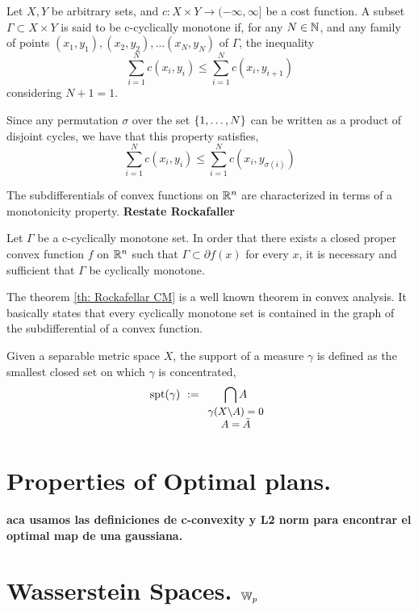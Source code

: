 \begin{definition}
	Let $X , Y$ be arbitrary sets, and $c:X\times Y \rightarrow (-\infty, \infty]$ be a cost function. A subset $\Gamma \subset X \times Y$ is said to be c-cyclically monotone if, for any $N\in\mathbb{N}$, and any family of points $(x_1, y_1), (x_2, y_2), \dots (x_N, y_N)$ of $\Gamma$, the inequality
	\begin{equation*}
		\sum_{i=1}^{N} c(x_i, y_i) \leq \sum_{i=1}^{N} c(x_i, y_{i+1}) 
	\end{equation*} 
	considering $N+1=1$. 
\end{definition}
Since any permutation $\sigma$ over the set $\left\lbrace 1, \dots, N \right\rbrace$ can be written as a product of disjoint cycles, we have that this property satisfies,
\begin{equation}
		\sum_{i=1}^{N} c(x_i, y_i) \leq \sum_{i=1}^{N} c(x_i, y_{\sigma(i)}) 
\end{equation}


The subdifferentials  of convex functions on $\mathbb{R}^n$ are characterized in terms of a monotonicity property. \textbf{Restate Rockafaller}

\begin{theorem}[Rockafellar]
\label{th: Rockafellar CM}
Let $\Gamma$ be a c-cyclically monotone set. In order that there exists a closed proper convex function $f$ on $\mathbb{R}^n$ such that $\Gamma \subset \partial f(x) $ for  every $x$, it is necessary and sufficient that $\Gamma$ be cyclically monotone. 
\end{theorem}

The theorem \ref{th: Rockafellar CM} is a well known theorem in convex analysis. It basically states that every cyclically monotone set is contained in the graph of the subdifferential of a convex function.


\begin{definition}
	Given a separable metric space $X$, the support of a measure $\gamma$ is defined as the smallest closed set on which $\gamma$ is concentrated,
	\begin{equation}
	\spt(\gamma)\ :=\underset{\small{\begin{array}{c}
			\gamma(X\backslash A)=0\\ A=\bar{A}  \end{array}}}{\bigcap A} 		
	\end{equation} 
\end{definition}


\section{Properties of Optimal plans.}

\begin{theorem}

\end{theorem}
\textbf{aca usamos las definiciones de c-convexity y L2 norm para encontrar el optimal map de una gaussiana.}


\section{Wasserstein Spaces. $\mathbb{W}_{p}$}

